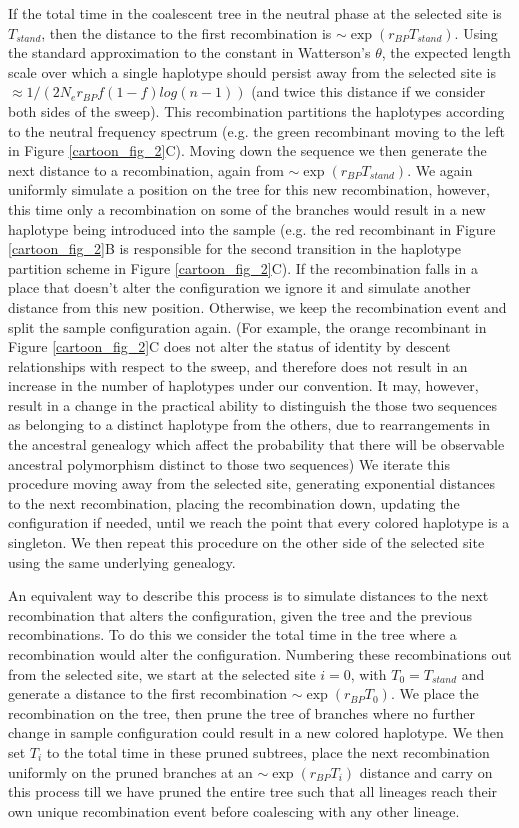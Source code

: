 \documentclass[a4paper,10pt]{article}
\begin{document}
If the total time in the coalescent tree in the neutral phase at the selected site is $T_{stand}$, then the distance to the first recombination is $\sim \exp \left( r_{BP} T_{stand} \right)$. Using the standard approximation to the constant in Watterson's $\theta$, the expected length scale over which a single haplotype should persist away from the selected site is $\approx 1/( 2 N_e r_{BP}f\left(1-f\right) log(n-1))$ (and twice this distance if we consider both sides of the sweep). This recombination partitions the haplotypes according to the neutral frequency spectrum (e.g. the green recombinant moving to the left in Figure \ref{cartoon_fig_2}C). Moving down the sequence we then generate the next distance to a recombination, again from $\sim \exp \left( r_{BP} T_{stand} \right)$. We again uniformly simulate a position on the tree for this new recombination, however, this time only a recombination on some of the branches would result in a new haplotype being introduced into the sample (e.g. the red recombinant in Figure \ref{cartoon_fig_2}B is responsible for the second transition in the haplotype partition scheme in Figure \ref{cartoon_fig_2}C). If the recombination falls in a place that doesn't alter the configuration we ignore it and simulate another distance from this new position. Otherwise, we keep the recombination event and split the sample configuration again. (For example, the orange recombinant in Figure \ref{cartoon_fig_2}C does not alter the status of identity by descent relationships with respect to the sweep, and therefore does not result in an increase in the number of haplotypes under our convention. It may, however, result in a change in the practical ability to distinguish the those two sequences as belonging to a distinct haplotype from the others, due to rearrangements in the ancestral genealogy which affect the probability that there will be observable ancestral polymorphism distinct to those two sequences) We iterate this procedure moving away from the selected site, generating exponential distances to the next recombination, placing the recombination down, updating the configuration if needed, until we reach the point that every colored haplotype is a singleton. We then repeat this procedure on the other side of the selected site using the same underlying genealogy.

An equivalent way to describe this process is to simulate distances to the next recombination that alters the configuration, given the tree and the previous recombinations. To do this we consider the total time in the tree where a recombination would alter the configuration. Numbering these recombinations out from the selected site,  we start at the selected site $i=0$, with $T_0 = T_{stand}$ and generate a distance to the first recombination $\sim \exp(r_{BP} T_0)$. We place the recombination on the tree, then prune the tree of branches where no further change in sample configuration could result in a new colored haplotype. We then set $T_i$ to the total time in these pruned subtrees, place the next recombination uniformly on the pruned branches at an $\sim \exp(r_{BP} T_i)$ distance and carry on this process till we have pruned the entire tree such that all lineages reach their own unique recombination event before coalescing with any other lineage.
\end{document}
